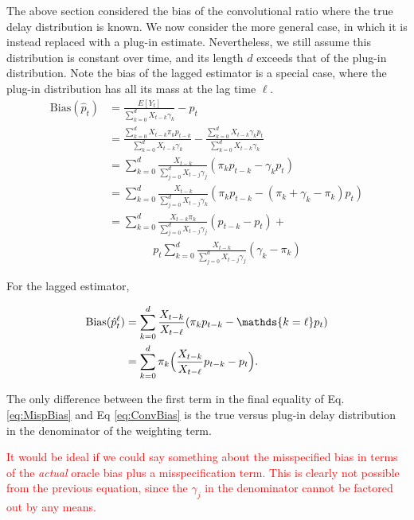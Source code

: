 \documentclass{article}
\begin{document}
The above section considered the bias of the convolutional ratio where the true delay distribution is known. We now consider the more general case, in which it is instead replaced with a plug-in estimate. Nevertheless, we still assume this distribution is constant over time, and its length $d$ exceeds that of the plug-in distribution. Note the bias of the lagged estimator is a special case, where the plug-in distribution has all its mass at the lag time $\ell$. 
\begin{align}\label{eq:MispBias}
    \text{Bias}(\hat{p}_t) &= \frac{E[Y_t]}{\sum_{k=0}^d X_{t-k}\gamma_k} - p_t \nonumber\\
    &= \frac{\sum_{k=0}^d X_{t-k}\pi_k p_{t-k}}{\sum_{k=0}^d X_{t-k}\gamma_k} - \frac{\sum_{k=0}^d X_{t-k}\gamma_k p_t}{\sum_{k=0}^d X_{t-k}\gamma_k}\nonumber \\
    &= \sum_{k=0}^d \frac{X_{t-k}}{\sum_{j=0}^d X_{t-j}\gamma_j}(\pi_k p_{t-k}-\gamma_k p_t)\nonumber \\
    &= \sum_{k=0}^d \frac{X_{t-k}}{\sum_{j=0}^d X_{t-j}\gamma_k}(\pi_k p_{t-k}-(\pi_k +\gamma_k-\pi_k) p_t)\nonumber \\
     &= \sum_{k=0}^d \frac{X_{t-k}\pi_k}{\sum_{j=0}^d X_{t-j}\gamma_j}(p_{t-k}-p_t) +\nonumber\\
     &\qquad\qquad p_t\sum_{k=0}^d \frac{X_{t-k}}{\sum_{j=0}^d X_{t-j}\gamma_j}(\gamma_k -\pi_k) 
\end{align}

For the lagged estimator,

\begin{align}\label{eq:LagBias}
    \text{Bias}(\hat{p}_t^\ell) &=  \sum_{k=0}^d \frac{X_{t-k}}{X_{t-\ell}}(\pi_k p_{t-k}-\mathds\{k=\ell\} p_t) \nonumber \\
    &= \sum_{k=0}^d \pi_k \Big(\frac{X_{t-k}}{X_{t-\ell}} p_{t-k} - p_{t} \Big).
\end{align}

The only difference between the first term in the final equality of Eq. \ref{eq:MispBias} and Eq \ref{eq:ConvBias} is the true versus plug-in delay distribution in the denominator of the weighting term. 

\textcolor{red}{It would be ideal if we could say something about the misspecified bias in terms of the \textit{actual} oracle bias plus a misspecification term. This is clearly not possible from the previous equation, since the $\gamma_j$ in the denominator cannot be factored out by any means.}
\end{document}
